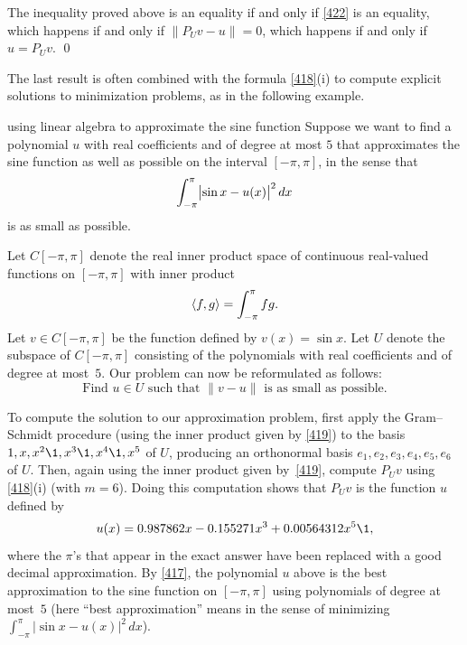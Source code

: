 The  inequality proved above is an equality if and only if \ref{422} is an equality, which
happens if and only if \mbox{$\|P_{\!U} v - u\| = 0$}, which happens if and only
if \mbox{$u = P_{\!U} v$}.
\qed

The last result is often combined with the formula \ref{418}(i) to
compute explicit solutions to minimization problems, as in the following example.

\begin{example}{using linear algebra to approximate the sine function}
Suppose we want to find a polynomial $u$ with real coefficients and of degree at most $5$ that approximates the sine function as well as possible on the interval $[-\pi, \pi]$, in the sense that
\[
\int_{-\pi}^{\pi} \abs[\big]{\sin x - u(x)}^2\,dx
\]
is as small as possible.

Let $C[-\pi, \pi]$ denote the real inner product space of continuous real-valued functions on $[-\pi, \pi]$ with inner product
\begin{equation} \label{419}
\ip{f, g} = \int_{-\pi}^{\pi} fg.
\end{equation}%
Let $v \in C[-\pi, \pi]$ be the function defined by $v(x) = \sin x$.
Let $U$ denote the subspace of $C[-\pi, \pi]$ consisting of the polynomials with real coefficients and of degree at most~$5$.  Our problem can now be reformulated as follows:
\[
\text{Find $u\in U$ such that $\|v - u\|$ is as
small as possible.}
\]


To compute the solution to our approximation problem, first apply the
Gram--Schmidt procedure (using the inner product given by \ref{419}) to
the basis $1, x, x^2\1, x^3\1, x^4\1, x^5$ of $U$, producing an orthonormal basis
$e_1, e_2, e_3, e_4, e_5, e_6$ of $U$. Then, again using the inner
product given by~\ref{419}, compute $P_{\!U} v$ using \ref{418}(i) (with
$m = 6$).  Doing this computation shows that $P_{\!U} v$ is  the function $u$ defined by
\begin{equation} \label{420}
u(x) = 0.987862 x - 0.155271 x^3 + 0.00564312 x^5\1,
\end{equation}%
where the $\pi$'s that appear in the exact answer have been replaced
with a good decimal approximation.
By \ref{417}, the polynomial $u$ above is the best approximation to the sine function on $[-\pi, \pi]$ using
polynomials of degree at most~$5$ \big(here ``best approximation'' means in the sense of minimizing
$\int_{-\pi}^{\pi} |\sin x - u(x)|^2\,dx$\big).


\end{example}
